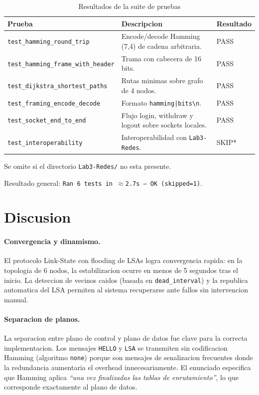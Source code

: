 ﻿\documentclass[12pt, a4paper]{article}
\begin{document}
\begin{table}[H]
    \centering
    \caption{Resultados de la suite de pruebas}
    \begin{tabular}{lp{6.5cm}l}
        \toprule
        \textbf{Prueba} & \textbf{Descripcion} & \textbf{Resultado} \\
        \midrule
        \texttt{test\_hamming\_round\_trip}
            & Encode/decode Hamming (7,4) de cadena arbitraria. & PASS \\
        \texttt{test\_hamming\_frame\_with\_header}
            & Trama con cabecera de 16 bits. & PASS \\
        \texttt{test\_dijkstra\_shortest\_paths}
            & Rutas minimas sobre grafo de 4 nodos. & PASS \\
        \texttt{test\_framing\_encode\_decode}
            & Formato \texttt{hamming|bits\textbackslash n}. & PASS \\
        \texttt{test\_socket\_end\_to\_end}
            & Flujo login, withdraw y logout sobre sockets locales. & PASS \\
        \texttt{test\_interoperability}
            & Interoperabilidad con \texttt{Lab3-Redes}. & SKIP* \\
        \bottomrule
    \end{tabular}

    {\small * Se omite si el directorio \texttt{Lab3-Redes/} no esta presente.}
\end{table}

\noindent Resultado general: \texttt{Ran 6 tests in $\approx$2.7s --- OK (skipped=1)}.

\section{Discusion}

\paragraph{Convergencia y dinamismo.}
El protocolo Link-State con flooding de LSAs logra convergencia rapida: en la
topologia de 6 nodos, la estabilizacion ocurre en menos de 5 segundos tras el
inicio. La deteccion de vecinos caidos (basada en \texttt{dead\_interval}) y la
republica automatica del LSA permiten al sistema recuperarse ante fallos sin
intervencion manual.

\paragraph{Separacion de planos.}
La separacion entre plano de control y plano de datos fue clave para la
correcta implementacion. Los mensajes \texttt{HELLO} y \texttt{LSA} se
transmiten sin codificacion Hamming (algoritmo \texttt{none}) porque son
mensajes de senalizacion frecuentes donde la redundancia aumentaria el
overhead innecesariamente. El enunciado especifica que Hamming aplica
\textit{``una vez finalizadas las tablas de enrutamiento''}, lo que corresponde
exactamente al plano de datos.
\end{document}
